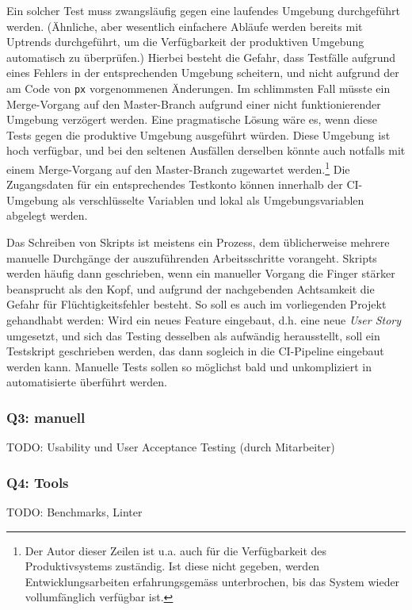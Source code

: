 Ein solcher Test muss zwangsläufig gegen eine laufendes Umgebung durchgeführt werden. (Ähnliche, aber wesentlich einfachere Abläufe werden bereits mit Uptrends durchgeführt, um die Verfügbarkeit der produktiven Umgebung automatisch zu überprüfen.) Hierbei besteht die Gefahr, dass Testfälle aufgrund eines Fehlers in der entsprechenden Umgebung scheitern, und nicht aufgrund der am Code von \texttt{px} vorgenommenen Änderungen. Im schlimmsten Fall müsste ein Merge-Vorgang auf den Master-Branch aufgrund einer nicht funktionierender Umgebung verzögert werden. Eine pragmatische Lösung wäre es, wenn diese Tests gegen die produktive Umgebung ausgeführt würden. Diese Umgebung ist hoch verfügbar, und bei den seltenen Ausfällen derselben könnte auch notfalls mit einem Merge-Vorgang auf den Master-Branch zugewartet werden.\footnote{Der Autor dieser Zeilen ist u.a. auch für die Verfügbarkeit des Produktivsystems zuständig. Ist diese nicht gegeben, werden Entwicklungsarbeiten erfahrungsgemäss unterbrochen, bis das System wieder vollumfänglich verfügbar ist.} Die Zugangsdaten für ein entsprechendes Testkonto können innerhalb der CI-Umgebung als verschlüsselte Variablen und lokal als Umgebungsvariablen abgelegt werden.

Das Schreiben von Skripts ist meistens ein Prozess, dem üblicherweise mehrere manuelle Durchgänge der auszuführenden Arbeitsschritte vorangeht. Skripts werden häufig dann geschrieben, wenn ein manueller Vorgang die Finger stärker beansprucht als den Kopf, und aufgrund der nachgebenden Achtsamkeit die Gefahr für Flüchtigkeitsfehler besteht. So soll es auch im vorliegenden Projekt gehandhabt werden: Wird ein neues Feature eingebaut, d.h. eine neue \textit{User Story} umgesetzt, und sich das Testing desselben als aufwändig herausstellt, soll ein Testskript geschrieben werden, das dann sogleich in die CI-Pipeline eingebaut werden kann. Manuelle Tests sollen so möglichst bald und unkompliziert in automatisierte überführt werden.

\subsubsection{Q3: manuell}

TODO: Usability und User Acceptance Testing (durch Mitarbeiter)

\subsubsection{Q4: Tools}

TODO: Benchmarks, Linter
